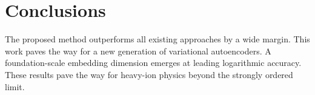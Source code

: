 \section{Conclusions}\label{sec:conclusions}

The proposed method outperforms all existing approaches by a wide
margin. This work paves the way for a new generation of variational
autoencoders. A foundation-scale embedding dimension emerges at leading
logarithmic accuracy. These results pave the way for heavy-ion physics
beyond the strongly ordered limit.

